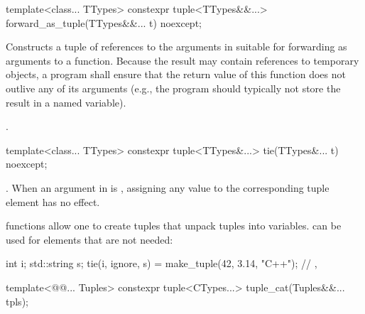 \documentclass{wg21}
\begin{document}
%
%
\begin{itemdecl}
    template<class... TTypes>
    constexpr tuple<TTypes&&...> forward_as_tuple(TTypes&&... t) noexcept;
\end{itemdecl}

\begin{itemdescr}
    \pnum
    \effects
    Constructs a tuple of references to the arguments in  suitable
    for forwarding as arguments to a function. Because the result may contain references
    to temporary objects, a program shall ensure that the return value of this
    function does not outlive any of its arguments (e.g., the program should typically
    not store the result in a named variable).
    
    \pnum
    \returns
    .
\end{itemdescr}

%
%
%
\begin{itemdecl}
    template<class... TTypes>
    constexpr tuple<TTypes&...> tie(TTypes&... t) noexcept;
\end{itemdecl}

\begin{itemdescr}
    \pnum
    \returns
    .  When an
    argument in  is , assigning
    any value to the corresponding tuple element has no effect.
    
    \pnum
    \begin{example}
         functions allow one to create tuples that unpack
        tuples into variables.  can be used for elements that
        are not needed:
        \begin{codeblock}
            int i; std::string s;
            tie(i, ignore, s) = make_tuple(42, 3.14, "C++");
            // , 
        \end{codeblock}
    \end{example}
\end{itemdescr}

\begin{itemdecl}
    template<@@... Tuples>
    constexpr tuple<CTypes...> tuple_cat(Tuples&&... tpls);
\end{itemdecl}
\end{document}
